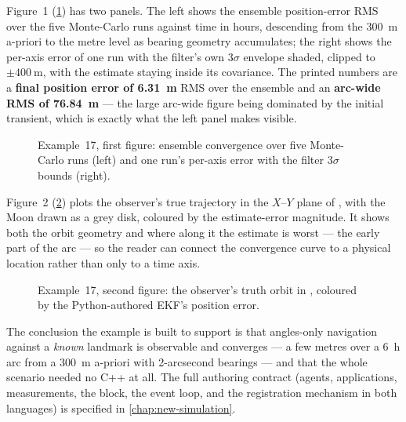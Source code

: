 Figure~1 (\cref{fig:tut-ex17-conv}) has two panels. The left shows the ensemble
position-error RMS over the five Monte-Carlo runs against time in hours,
descending from the \SI{300}{\meter} a-priori to the metre level as bearing
geometry accumulates; the right shows the per-axis error of one run with the
filter's own $3\sigma$ envelope shaded, clipped to $\pm\SI{400}{\meter}$, with
the estimate staying inside its covariance. The printed numbers are a
\textbf{final position error of \SI{6.31}{\meter}} RMS over the ensemble and an
\textbf{arc-wide RMS of \SI{76.84}{\meter}} --- the large arc-wide figure being
dominated by the initial transient, which is exactly what the left panel makes
visible.

\begin{figure}[htbp]
  \centering
  \caption{Example~17, first figure: ensemble convergence over five Monte-Carlo
           runs (left) and one run's per-axis error with the filter $3\sigma$
           bounds (right).}
  \label{fig:tut-ex17-conv}
\end{figure}

Figure~2 (\cref{fig:tut-ex17-orbit}) plots the observer's true trajectory in the
$X$--$Y$ plane of , with the Moon drawn as a grey disk, coloured
by the estimate-error magnitude. It shows both the orbit geometry and where
along it the estimate is worst --- the early part of the arc --- so the reader
can connect the convergence curve to a physical location rather than only to a
time axis.

\begin{figure}[htbp]
  \centering
  \caption{Example~17, second figure: the observer's truth orbit in
           , coloured by the Python-authored EKF's position
           error.}
  \label{fig:tut-ex17-orbit}
\end{figure}

The conclusion the example is built to support is that angles-only navigation
against a \emph{known} landmark is observable and converges --- a few metres
over a \SI{6}{\hour} arc from a \SI{300}{\meter} a-priori with 2-arcsecond
bearings --- and that the whole scenario needed no C++ at all. The full
authoring contract (agents, applications, measurements, the  block,
the event loop, and the registration mechanism in both languages) is specified
in \cref{chap:new-simulation}.


